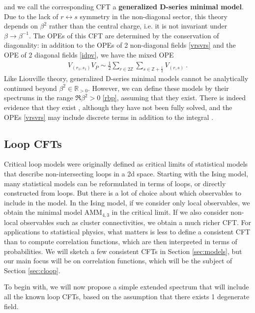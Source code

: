 \documentclass[12pt, a4paper]{article}
\newcommand{\myindex}[1]{\textbf{\boldmath #1}}
\begin{document}
and we call the corresponding CFT a \myindex{generalized D-series minimal model}. Due to the lack of $r\leftrightarrow s$ symmetry in the non-diagonal sector, this theory depends on $\beta^2$ rather than the central charge, i.e. it is not invariant under $\beta \to \beta^{-1}$. 
The OPEs of this CFT are determined by the conservation of diagonality: in addition to the OPEs of 2 non-diagonal fields \eqref{vrsvrs} and the OPE of 2 diagonal fields \eqref{idpv}, we have the mixed OPE 
\begin{align}
 V_{(r_1,s_1)}V_P \sim \frac12 \sum_{r\in 2\mathbb{Z}}\sum_{s\in \mathbb{Z}+\frac12} V_{(r,s)} \ . 
\end{align}
Like Liouville theory, generalized D-series minimal models cannot be analytically continued beyond $\beta^2\in \mathbb{R}_{>0}$. However, we can define these models by their spectrums in the range $\Re\beta^2>0$ \eqref{rbp}, assuming that they exist. There is indeed evidence that they exist \cite{mr17}, although they have not been fully solved, and the OPEs \eqref{vrsvrs} may include discrete terms in addition to the integral \cite{rib19}. 


\subsection{Loop CFTs}

Critical loop models were originally defined as critical limits of statistical models that describe non-intersecting loops in a 2d space. Starting with the Ising model, many statistical models can be reformulated in terms of loops, or directly constructed from loops. But there is a lot of choice about which observables to include in the model. In the Ising model, if we consider only local observables, we obtain the minimal model $\text{AMM}_{4,3}$ in the critical limit. If we also consider non-local observables such as cluster connectivities, we obtain a much richer CFT. For applications to statistical physics, what matters is less to define a consistent CFT than to compute correlation functions, which are then interpreted in terms of probabilities. We will sketch a few consistent CFTs in Section \ref{sec:models}, but our main focus will be on correlation functions, which will be the subject of Section \ref{sec:cloop}.

To begin with, we will now propose a simple extended spectrum that will include all the known loop CFTs, based on the assumption that there exists 1 degenerate field. 
\end{document}
